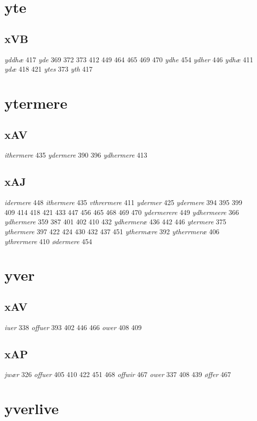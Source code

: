 \documentclass[a4paper,twocolumn]{article}
\begin{document}
\section{yte}
\label{sec:org7289e87}
\subsection{xVB}
\label{sec:orgbdd89f7}
\emph{yddhæ} 417 \emph{yde} 369 372 373 412 449 464 465 469 470 \emph{ydhe} 454 \emph{ydher} 446 \emph{ydhæ} 411 \emph{ydæ} 418 421 \emph{ytes} 373 \emph{yth} 417 
\section{ytermere}
\label{sec:org91d8a20}
\subsection{xAV}
\label{sec:org3ac9bd7}
\emph{ithermere} 435 \emph{ydermere} 390 396 \emph{ydhermere} 413 
\subsection{xAJ}
\label{sec:org2822c46}
\emph{idermere} 448 \emph{ithermere} 435 \emph{vthrermere} 411 \emph{ydermer} 425 \emph{ydermere} 394 395 399 409 414 418 421 433 447 456 465 468 469 470 \emph{ydermerere} 449 \emph{ydhermeere} 366 \emph{ydhermere} 359 387 401 402 410 432 \emph{ydhermeræ} 436 442 446 \emph{ytermere} 375 \emph{ythermere} 397 422 424 430 432 437 451 \emph{ythermære} 392 \emph{ytherrmeræ} 406 \emph{ythrermere} 410 \emph{ødermere} 454 
\section{yver}
\label{sec:org9026040}
\subsection{xAV}
\label{sec:org972f885}
\emph{iuer} 338 \emph{offuer} 393 402 446 466 \emph{ower} 408 409 
\subsection{xAP}
\label{sec:org591be95}
\emph{jwær} 326 \emph{offuer} 405 410 422 451 468 \emph{offwir} 467 \emph{ower} 337 408 439 \emph{øffer} 467 
\section{yverlive}
\label{sec:orgf1a6f7e}
\end{document}
